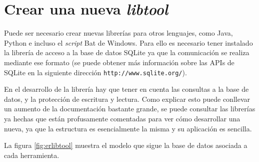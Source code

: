 \section*{Crear una nueva \emph{libtool}}
Puede ser necesario crear nuevas librerías para otros lenguajes, como 
Java, Python e incluso el \emph{script} Bat de Windows. Para ello es 
necesario tener instalado la librería de acceso a la base de datos 
SQLite ya que la comunicación se realiza mediante ese formato (se 
puede obtener más información sobre las APIs de SQLite en la 
siguiente dirección \texttt{http://www.sqlite.org/}).

En el desarrollo de la librería hay que tener en cuenta las consultas 
a la base de datos, y la protección de escritura y lectura. Como 
explicar esto puede conllevar un aumento de la documentación bastante 
grande, se puede consultar las librerías ya hechas que están 
profusamente comentadas para ver cómo desarrollar una nueva, ya que la 
estructura es esencialmente la misma y su aplicación es sencilla.

La figura \ref{fig:erlibtool} muestra el modelo que sigue la base de 
datos asociada a cada herramienta.

\cleardoublepage
